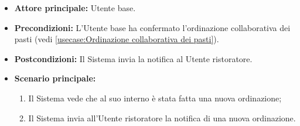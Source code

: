\label{usecase:Notifica ordine}
\begin{itemize}
	\item \textbf{Attore principale:} Utente base.
	
	\item \textbf{Precondizioni:} L'Utente base ha confermato l'ordinazione collaborativa dei pasti (vedi \autoref{usecase:Ordinazione collaborativa dei pasti}).

	\item \textbf{Postcondizioni:} Il Sistema invia la notifica al Utente ristoratore.
     
	\item \textbf{Scenario principale:}
	      \begin{enumerate}
                \item Il Sistema vede che al suo interno è stata fatta una nuova ordinazione;
                \item Il Sistema invia all'Utente ristoratore la notifica di una nuova ordinazione.
	      \end{enumerate}
\end{itemize}